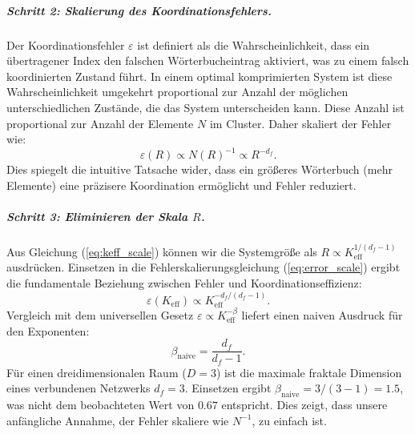\documentclass[12pt,a4paper]{article}
\theoremstyle{remark}
\newcommand{\Ke}{K_{\mathrm{eff}}}
\begin{document}
	\subparagraph*{Schritt 2: Skalierung des Koordinationsfehlers.}
	Der Koordinationsfehler \(\varepsilon\) ist definiert als die Wahrscheinlichkeit, dass ein übertragener Index den falschen Wörterbucheintrag aktiviert, was zu einem falsch koordinierten Zustand führt. In einem optimal komprimierten System ist diese Wahrscheinlichkeit umgekehrt proportional zur Anzahl der möglichen unterschiedlichen Zustände, die das System unterscheiden kann. Diese Anzahl ist proportional zur Anzahl der Elemente \(N\) im Cluster. Daher skaliert der Fehler wie:
	\begin{equation}
		\varepsilon(R) \propto N(R)^{-1} \propto R^{-d_f}.
		\label{eq:error_scale}
	\end{equation}
	Dies spiegelt die intuitive Tatsache wider, dass ein größeres Wörterbuch (mehr Elemente) eine präzisere Koordination ermöglicht und Fehler reduziert.
	
	\subparagraph*{Schritt 3: Eliminieren der Skala \(R\).}
	Aus Gleichung (\ref{eq:keff_scale}) können wir die Systemgröße als \(R \propto \Ke^{1/(d_f-1)}\) ausdrücken. Einsetzen in die Fehlerskalierungsgleichung (\ref{eq:error_scale}) ergibt die fundamentale Beziehung zwischen Fehler und Koordinationseffizienz:
	\begin{equation}
		\varepsilon(\Ke) \propto \Ke^{-d_f/(d_f-1)}.
		\label{eq:error_keff_naive}
	\end{equation}
	Vergleich mit dem universellen Gesetz \(\varepsilon \propto \Ke^{-\beta}\) liefert einen naiven Ausdruck für den Exponenten:
	\begin{equation}
		\beta_{\text{naive}} = \frac{d_f}{d_f-1}.
		\label{eq:beta_naive}
	\end{equation}
	Für einen dreidimensionalen Raum (\(D = 3\)) ist die maximale fraktale Dimension eines verbundenen Netzwerks \(d_f = 3\). Einsetzen ergibt \(\beta_{\text{naive}} = 3/(3-1) = 1.5\), was nicht dem beobachteten Wert von \(0.67\) entspricht. Dies zeigt, dass unsere anfängliche Annahme, der Fehler skaliere wie \(N^{-1}\), zu einfach ist.
	
\end{document}
